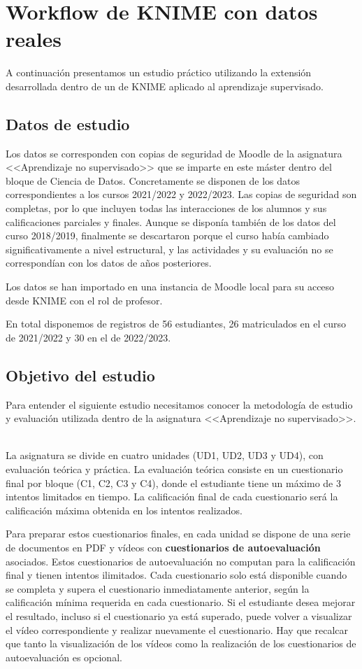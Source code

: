 \newpage
\section{Workflow de KNIME con datos reales}

A continuación presentamos un estudio práctico utilizando la extensión desarrollada dentro 
de un  de KNIME aplicado al aprendizaje supervisado. 

\subsection{Datos de estudio}

Los datos se corresponden con copias de seguridad de Moodle de la asignatura <<Aprendizaje no supervisado>> que se imparte en este máster dentro del bloque de Ciencia de Datos. 
Concretamente se disponen de los datos correspondientes a los cursos 2021/2022 y 2022/2023. Las copias de seguridad son completas, por lo que incluyen todas las interacciones de los alumnos y sus calificaciones parciales y finales. 
Aunque se disponía también de los datos del curso 2018/2019, finalmente se descartaron porque el curso había cambiado significativamente a nivel estructural, y las actividades y su evaluación no se correspondían con los datos de años posteriores. 
\

Los datos se han importado en una instancia de Moodle local para su acceso desde KNIME con el rol de profesor. 
\

En total disponemos de registros de 56 estudiantes, 26 matriculados en el curso de 2021/2022 y 30 en el de 2022/2023. 

\subsection{Objetivo del estudio}

Para entender el siguiente estudio necesitamos conocer la metodología de estudio y evaluación utilizada dentro de la asignatura <<Aprendizaje no supervisado>>. 
\

La asignatura se divide en cuatro unidades (UD1, UD2, UD3 y UD4), con evaluación teórica y práctica. La evaluación teórica consiste
en un cuestionario final por bloque (C1, C2, C3 y C4), donde el estudiante tiene un máximo de 3 intentos limitados en tiempo. 
La calificación final de cada cuestionario será la calificación máxima obtenida en los intentos realizados. 
\

Para preparar estos cuestionarios finales, en cada unidad se dispone de una serie de documentos en PDF y vídeos con \textbf{cuestionarios de autoevaluación} asociados. 
Estos cuestionarios de autoevaluación no computan para la calificación final y tienen intentos ilimitados. Cada cuestionario solo está disponible cuando se 
completa y supera el cuestionario inmediatamente anterior, según la calificación mínima requerida en cada cuestionario. Si el estudiante desea mejorar el resultado, incluso si 
el cuestionario ya está superado, puede volver a visualizar el vídeo correspondiente y realizar nuevamente el cuestionario. Hay que recalcar que tanto la visualización de 
los vídeos como la realización de los cuestionarios de autoevaluación es opcional. 
\

